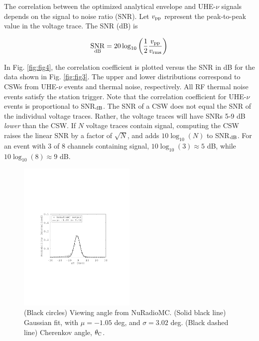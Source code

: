 \documentclass[amsmath,amssymb,aps,prd,10pt,twocolumn,showkeys]{revtex4}
\DeclareMathOperator{\snr}{SNR}
\begin{document}
The correlation between the optimized analytical envelope and UHE-$\nu$ signals depends on the signal to noise ratio (SNR).  Let $v_{\rm pp}$ represent the peak-to-peak value in the voltage trace.  The SNR (dB) is

\begin{equation}
\snr_{\rm dB} = 20\log_{10}\left(\frac{1}{2}\frac{v_{\rm pp}}{v_{\rm rms}}\right)
\end{equation}

In Fig. \ref{fig:fig4}, the correlation coefficient is plotted versus the SNR in dB for the data shown in Fig. \ref{fig:fig3}.  The upper and lower distributions correspond to CSWs from UHE-$\nu$ events and thermal noise, respectively.  All RF thermal noise events satisfy the station trigger.  Note that the correlation coefficient for UHE-$\nu$ events is proportional to SNR$_{\rm dB}$.  The SNR of a CSW does not equal the SNR of the individual voltage traces.  Rather, the voltage traces will have SNRs 5-9 dB \textit{lower} than the CSW.  If $N$ voltage traces contain signal, computing the CSW raises the linear SNR by a factor of $\sqrt{N}$, and adds $10\log_{10}(N)$ to SNR$_{\rm dB}$.  For an event with 3 of 8 channels containing signal, $10\log_{10}(3)\approx 5$ dB, while $10\log_{10}(8)\approx 9$ dB.

\begin{figure}
\centering
\includegraphics[width=0.5\textwidth,trim=3.25cm 8.25cm 4.5cm 9.0cm,clip=true]{Aug18_plot1.pdf}
\caption{\label{fig:fig5} (Black circles) Viewing angle from NuRadioMC. (Solid black line) Gaussian fit, with $\mu = -1.05$ deg, and $\sigma = 3.02$ deg.  (Black dashed line) Cherenkov angle, $\theta_{\rm C}$.}
\end{figure}
\end{document}
